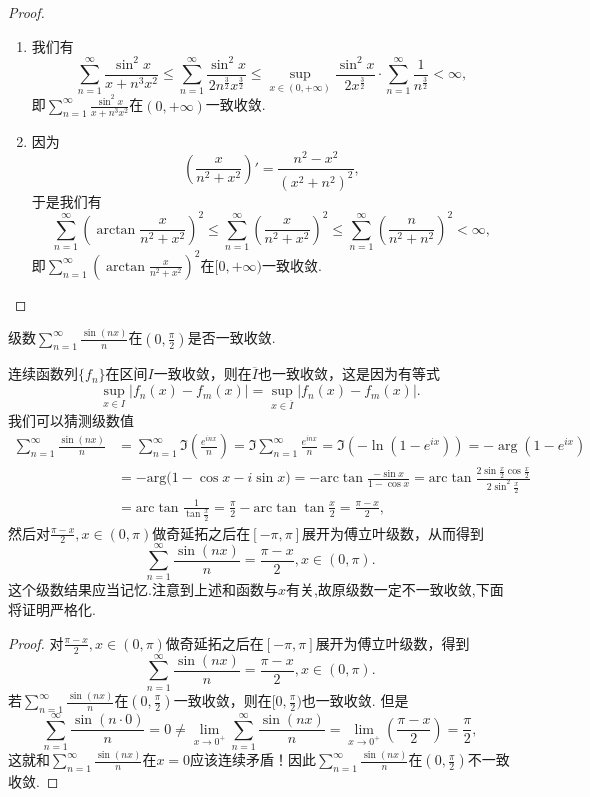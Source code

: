 \documentclass[../../main.tex]{subfiles}
\begin{document}
\begin{proof}
\begin{enumerate}
\item 我们有
\[
\sum_{n=1}^{\infty} \frac{\sin^2 x}{x + n^3 x^2} \leqslant \sum_{n=1}^{\infty} \frac{\sin^2 x}{2n^{\frac{3}{2}} x^{\frac{3}{2}}} \leqslant \sup_{x \in (0, +\infty)} \frac{\sin^2 x}{2x^{\frac{3}{2}}} \cdot \sum_{n=1}^{\infty} \frac{1}{n^{\frac{3}{2}}} < \infty,
\]
即\(\sum_{n=1}^{\infty} \frac{\sin^2 x}{x + n^3 x^2}\)在\((0, +\infty)\)一致收敛.

\item 因为
\[
\left( \frac{x}{n^2 + x^2} \right)' = \frac{n^2 - x^2}{(x^2 + n^2)^2},
\]
于是我们有
\[
\sum_{n=1}^{\infty} \left( \arctan \frac{x}{n^2 + x^2} \right)^2 \leqslant \sum_{n=1}^{\infty} \left( \frac{x}{n^2 + x^2} \right)^2 \leqslant \sum_{n=1}^{\infty} \left( \frac{n}{n^2 + n^2} \right)^2 < \infty,
\]
即\(\sum_{n=1}^{\infty} \left( \arctan \frac{x}{n^2 + x^2} \right)^2\)在\([0, +\infty)\)一致收敛.
\end{enumerate}
\end{proof}

\begin{example}
级数\(\sum_{n=1}^{\infty} \frac{\sin(nx)}{n}\)在\((0, \frac{\pi}{2})\)是否一致收敛.
\end{example}
\begin{note}
连续函数列\(\{f_n\}\)在区间\(I\)一致收敛，则在\(\overline{I}\)也一致收敛，这是因为有等式
\[
\sup_{x \in I} |f_n(x) - f_m(x)| = \sup_{x \in \overline{I}} |f_n(x) - f_m(x)|.
\]
我们可以猜测级数值
\begin{align*}
\sum_{n=1}^{\infty} \frac{\sin(nx)}{n} &= \sum_{n=1}^{\infty} \Im \left( \frac{e^{inx}}{n} \right) = \Im \sum_{n=1}^{\infty} \frac{e^{inx}}{n} = \Im (-\ln(1 - e^{ix})) = -\arg(1 - e^{ix}) \\
&= -\mathrm{arg(}1-\cos x-i\sin x)=-\mathrm{arc}\tan \frac{-\sin x}{1-\cos x}=\mathrm{arc}\tan \frac{2\sin \frac{x}{2}\cos \frac{x}{2}}{2\sin ^2\frac{x}{2}}\\
&= \mathrm{arc}\tan \frac{1}{\tan \frac{x}{2}}=\frac{\pi}{2}-\mathrm{arc}\tan\tan \frac{x}{2}=\frac{\pi -x}{2},
\end{align*}
然后对\(\frac{\pi - x}{2}, x \in (0, \pi)\)做奇延拓之后在\([-\pi, \pi]\)展开为傅立叶级数，从而得到
\[
\sum_{n=1}^{\infty} \frac{\sin(nx)}{n} = \frac{\pi - x}{2}, x \in (0, \pi).
\]
这个级数结果应当记忆.注意到上述和函数与$x$有关,故原级数一定不一致收敛,下面将证明严格化.
\end{note}
\begin{proof}
对\(\frac{\pi - x}{2}, x \in (0, \pi)\)做奇延拓之后在\([-\pi, \pi]\)展开为傅立叶级数，得到
\[
\sum_{n=1}^{\infty} \frac{\sin(nx)}{n} = \frac{\pi - x}{2}, x \in (0, \pi).
\]
若\(\sum_{n=1}^{\infty} \frac{\sin(nx)}{n}\)在\((0, \frac{\pi}{2})\)一致收敛，则在\([0, \frac{\pi}{2})\)也一致收敛. 但是
\[
\sum_{n=1}^{\infty} \frac{\sin(n \cdot 0)}{n} =0 \neq \lim_{x \to 0^+} \sum_{n=1}^{\infty} \frac{\sin(nx)}{n} = \lim_{x \to 0^+} \left( \frac{\pi - x}{2} \right) = \frac{\pi}{2},
\]
这就和\(\sum_{n=1}^{\infty} \frac{\sin(nx)}{n}\)在\(x = 0\)应该连续矛盾！因此\(\sum_{n=1}^{\infty} \frac{\sin(nx)}{n}\)在\((0, \frac{\pi}{2})\)不一致收敛.
\end{proof}
\end{document}
